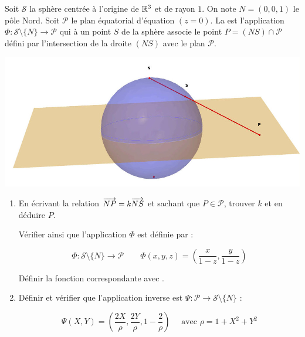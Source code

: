 \begin{frame}
\begin{tp}
Soit $ \mathcal{S}$ la sphère centrée à l'origine de $\mathbb{R}^3$ et de rayon $1$.
On note $N = (0,0,1)$ le pôle Nord. Soit $\mathcal{P}$ le plan
équatorial d'équation $(z=0)$. La 
est l'application $\Phi : \mathcal{S} \setminus \{N\} \to \mathcal{P}$
qui à un point $S$ de la sphère associe le point $P = (NS) \cap \mathcal{P}$
défini par l'intersection de la droite $(NS)$ avec le plan $\mathcal{P}$.

\begin{center}
\includegraphics[scale=0.3]{figures/stereo1bis.jpg} 
\end{center}
\end{tp}
\end{frame}


\begin{frame}
\begin{tp}
\begin{enumerate}
  \item En écrivant la relation $\overrightarrow{NP} = k \overrightarrow{NS}$ et sachant que $P \in \mathcal{P}$, trouver
  $k$ et en déduire $P$.
  
  Vérifier ainsi que l'application $\Phi$ est définie par :
  
  \vspace*{-2ex}
  $$\Phi : \mathcal{S} \setminus \{N\} \to \mathcal{P} \qquad 
  \Phi(x,y,z) = \left( \frac{x}{1-z}, \frac{y}{1-z} \right)$$
  \vspace*{-2ex}
  
  Définir la fonction correspondante avec \Sage.
  
  \item  Définir et vérifier que l'application inverse est $\Psi : \mathcal{P} \to \mathcal{S}\setminus \{N\}$ :
  
  \vspace*{-2ex}
  $$\Psi (X,Y) = \left( \frac{2X}{\rho},\frac{2Y}{\rho},1-\frac{2}{\rho}  \right) \quad \text{ avec } \rho = 1+X^2+Y^2$$
  \vspace*{-2ex}
  
 \end{enumerate}

\end{tp}
\end{frame}


